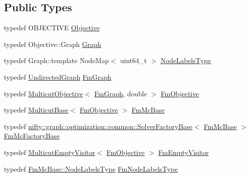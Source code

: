 \subsection*{Public Types}
\begin{DoxyCompactItemize}
\item 
typedef O\+B\+J\+E\+C\+T\+I\+V\+E \hyperlink{classnifty_1_1graph_1_1optimization_1_1multicut_1_1FusionMove_a937dd91e6a61b9b906c97bc1089e2540}{Objective}
\item 
typedef Objective\+::\+Graph \hyperlink{classnifty_1_1graph_1_1optimization_1_1multicut_1_1FusionMove_a445f69d8de37009f03510671ae041ca9}{Graph}
\item 
typedef Graph\+::template Node\+Map$<$ uint64\+\_\+t $>$ \hyperlink{classnifty_1_1graph_1_1optimization_1_1multicut_1_1FusionMove_a29ffe23abd07d62d8a952441d1ebef45}{Node\+Labels\+Type}
\item 
typedef \hyperlink{classnifty_1_1graph_1_1UndirectedGraph}{Undirected\+Graph} \hyperlink{classnifty_1_1graph_1_1optimization_1_1multicut_1_1FusionMove_a2bf067e2ddf02a5d392ec4249c47f3f6}{Fm\+Graph}
\item 
typedef \hyperlink{classnifty_1_1graph_1_1optimization_1_1multicut_1_1MulticutObjective}{Multicut\+Objective}$<$ \hyperlink{classnifty_1_1graph_1_1optimization_1_1multicut_1_1FusionMove_a2bf067e2ddf02a5d392ec4249c47f3f6}{Fm\+Graph}, double $>$ \hyperlink{classnifty_1_1graph_1_1optimization_1_1multicut_1_1FusionMove_a57b32cd719f50645876f2ac200f9932b}{Fm\+Objective}
\item 
typedef \hyperlink{classnifty_1_1graph_1_1optimization_1_1multicut_1_1MulticutBase}{Multicut\+Base}$<$ \hyperlink{classnifty_1_1graph_1_1optimization_1_1multicut_1_1FusionMove_a57b32cd719f50645876f2ac200f9932b}{Fm\+Objective} $>$ \hyperlink{classnifty_1_1graph_1_1optimization_1_1multicut_1_1FusionMove_a045052b4501006843db153fbefc62cdc}{Fm\+Mc\+Base}
\item 
typedef \hyperlink{classnifty_1_1graph_1_1optimization_1_1common_1_1SolverFactoryBase}{nifty\+::graph\+::optimization\+::common\+::\+Solver\+Factory\+Base}$<$ \hyperlink{classnifty_1_1graph_1_1optimization_1_1multicut_1_1FusionMove_a045052b4501006843db153fbefc62cdc}{Fm\+Mc\+Base} $>$ \hyperlink{classnifty_1_1graph_1_1optimization_1_1multicut_1_1FusionMove_a5c77d3bdf410275f9488c2e6dc2f7392}{Fm\+Mc\+Factory\+Base}
\item 
typedef \hyperlink{namespacenifty_1_1graph_1_1optimization_1_1multicut_afabf492f6831ee43b16508cb78726be8}{Multicut\+Empty\+Visitor}$<$ \hyperlink{classnifty_1_1graph_1_1optimization_1_1multicut_1_1FusionMove_a57b32cd719f50645876f2ac200f9932b}{Fm\+Objective} $>$ \hyperlink{classnifty_1_1graph_1_1optimization_1_1multicut_1_1FusionMove_a46c112fcbbf408fde2488c59727b5dd6}{Fm\+Empty\+Visitor}
\item 
typedef \hyperlink{classnifty_1_1graph_1_1optimization_1_1common_1_1SolverBase_a6e4e465f3b6e039882669fcfb9714818}{Fm\+Mc\+Base\+::\+Node\+Labels\+Type} \hyperlink{classnifty_1_1graph_1_1optimization_1_1multicut_1_1FusionMove_a283c909a0176f78b4ad7ad56c2dfcff2}{Fm\+Node\+Labels\+Type}
\end{DoxyCompactItemize}
